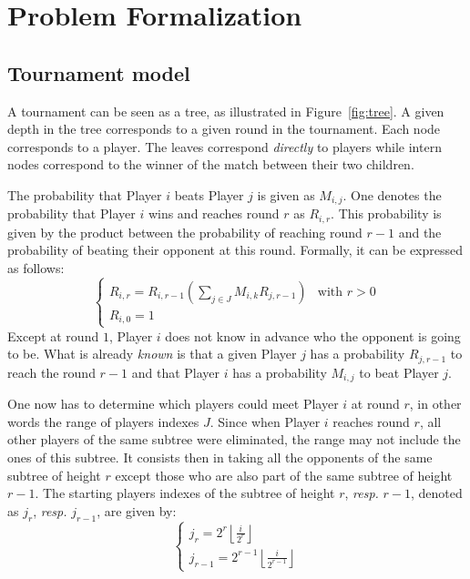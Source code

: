 \documentclass[a4paper,9pt]{report}
\theoremstyle{mytheor}
\begin{document}
\section{Problem Formalization}
\subsection{Tournament model}
A tournament can be seen as a tree, as illustrated in Figure~\ref{fig:tree}. A given depth in the tree corresponds to a given round
in the tournament. Each node corresponds to a player.
The leaves correspond \textit{directly} to players while intern nodes correspond to
the winner of the match between their two children.

The probability that Player $i$ beats Player $j$ is given as $M_{i,j}$.
One denotes the probability that Player $i$ wins and reaches round $r$ as $R_{i,r}$.
This probability is given by the product between the probability of reaching round $r-1$
and the probability of beating their opponent at this round.
Formally, it can be expressed as follows:
\begin{equation}
  \begin{cases}
    R_{i,r} = R_{i,r-1} \left(\sum_{j \in J}M_{i,k}R_{j, r-1} \right) & \text{with $r > 0$}\\
    R_{i,0} = 1
  \end{cases}
\end{equation}
Except at round $1$, Player $i$ does not know in advance who the opponent is going to be. 
What is already \textit{known} is that a given Player $j$ has a probability $R_{j, r-1}$ to reach the round $r-1$ and that Player $i$ has a probability $M_{i,j}$ to beat Player $j$.

One now has to determine which players could meet Player $i$ at round $r$, in other
words the range of players indexes $J$.
Since when Player $i$ reaches round $r$, all other players of the same
subtree were eliminated, the range may not include the ones of this subtree.
It consists then in taking all the opponents of the same subtree of height $r$
except those who are also part of the same subtree of height $r-1$.
The starting players indexes of the subtree of height $r$, \textit{resp.} $r-1$, denoted as $j_{r}$, \textit{resp.} $j_{r-1}$, are given by:
\begin{equation}
  \begin{cases}
    j_{r} = 2^{r}\left\lfloor \frac{i}{2^{r}} \right\rfloor \\
    j_{r-1} = 2^{r-1}\left\lfloor \frac{i}{2^{r-1}} \right\rfloor
  \end{cases}
\end{equation}
\end{document}
